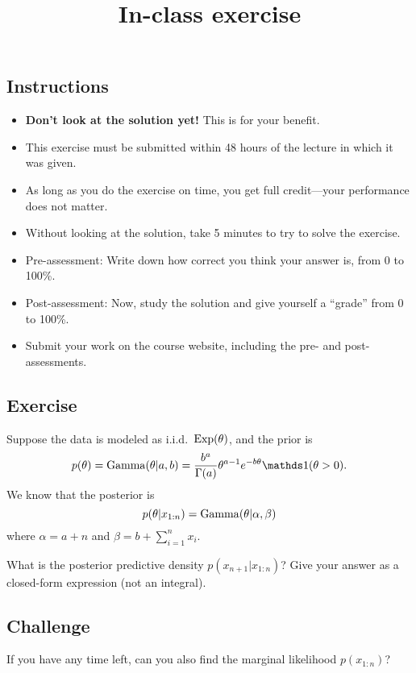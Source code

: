 \documentclass[12pt]{article}
\title{In-class exercise}
\author{}
\date{}
\begin{document}
\maketitle

\subsection*{Instructions}
\begin{itemize}
\item \textbf{Don't look at the solution yet!} This is for your benefit.
\item This exercise must be submitted within 48 hours of the lecture in which it was given. 
\item As long as you do the exercise on time, you get full credit---your performance does not matter.
\item Without looking at the solution, take 5 minutes to try to solve the exercise.
\item Pre-assessment: Write down how correct you think your answer is, from 0 to 100\%.
\item Post-assessment: Now, study the solution and give yourself a ``grade'' from 0 to 100\%.
\item Submit your work on the course website, including the pre- and post- assessments.
\end{itemize}

\subsection*{Exercise}
Suppose the data is modeled as i.i.d.\ $\operatorname*{Exp}(\theta)$, and the prior is
$$ p(\theta) =\Ga(\theta|a,b)=\frac{b^a}{\Gamma(a)}\theta^{a-1} e^{-b \theta}\I(\theta>0). $$
We know that the posterior is
$$p(\theta|x_{1:n}) =\operatorname*{Gamma}(\theta| \alpha,\beta)$$
where $\alpha = a + n$ and $\beta = b +\sum_{i = 1}^n x_i$.

What is the posterior predictive density $p(x_{n+1}|x_{1:n})$?
Give your answer as a closed-form expression (not an integral).

\subsection*{Challenge}
If you have any time left, can you also find the marginal likelihood $p(x_{1:n})$?
\end{document}
